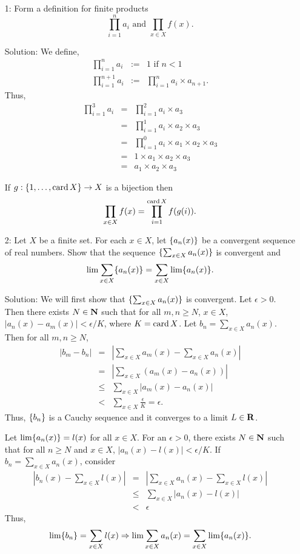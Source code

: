 \begin{enumerate}
\item[1:] Form a definition for finite products 
\[
\prod_{i=1}^n a_i \text{ and } \prod_{x \in X} f(x).
\]
\item[Solution:] We define,
\begin{eqnarray*}
\prod_{i=1}^na_i &:=& 1 \text{ if } n < 1 \\
\prod_{i=1}^{n+1}a_i &:=& \prod_{i=1}^n a_i \times a_{n+1}.
\end{eqnarray*}
Thus,
\begin{eqnarray*}
\prod_{i=1}^3a_i &=& \prod_{i=1}^2 a_i \times a_3 \\
 &=& \prod_{i=1}^1 a_i \times a_2 \times a_3 \\
 &=& \prod_{i=1}^0 a_i \times a_1 \times a_2 \times a_3 \\
 &=& 1 \times a_1 \times a_2 \times a_3 \\
 &=& a_1 \times a_2 \times a_3 
\end{eqnarray*}

If $g:\{1, \ldots, \operatorname{card} X\} \rightarrow X$ is a bijection then
\[
\prod_{x \in X} f(x) = \prod_{i=1}^{\operatorname{card} X} f(g(i)).
\]

\item[2:] Let $X$ be a finite set. For each $x \in X$, let $\{a_n(x)\}$
be a convergent sequence of real numbers. Show that the sequence 
$\{\sum_{x \in X} a_n(x)\}$ is convergent and
\[
\lim\sum_{x \in X}\{a_n(x)\} = \sum_{x \in X}\lim\{a_n(x)\}.
\]
\item[Solution:] We will first show that $\{\sum_{x \in X} a_n(x)\}$ is 
convergent. Let $\epsilon > 0$. Then there exists $N \in \mathbf{N}$ such that
for all $m, n \ge N$, $x \in X$, $|a_n(x) - a_m(x)| < \epsilon/K$, where
$K = \operatorname{card} X$. Let $b_n = \sum_{x \in X} a_n(x)$. Then for all $m, n \ge N$,
\begin{eqnarray*}
|b_m - b_n| 
 &=& \left|\sum_{x \in X} a_m(x) - \sum_{x \in X} a_n(x)\right| \\
 &=& \left|\sum_{x \in X} (a_m(x) - a_n(x))\right| \\
 &\le& \sum_{x \in X}|a_m(x) - a_n(x)| \\
 &<& \sum_{x \in X}\frac{\epsilon}{K} = \epsilon.
\end{eqnarray*}
Thus, $\{b_n\}$ is a Cauchy sequence and it converges to a limit $L \in 
\mathbf{R}$. 

Let $\lim\{a_n(x)\} = l(x)$ for all $x \in X$. For an $\epsilon > 0$,
there exists $N \in \mathbf{N}$ such that for all $n \ge N$ and $x \in X$,
$|a_n(x) - l(x)| < \epsilon/K$. If $b_n = \sum_{x \in X} a_n(x)$, consider
\begin{eqnarray*}
\left|b_n(x) - \sum_{x \in X}l(x)\right| 
 &=& \left|\sum_{x \in X}a_n(x) - \sum_{x \in X}l(x)\right| \\
 &\le& \sum_{x \in X} |a_n(x) - l(x)| \\
 &<& \epsilon
\end{eqnarray*}
Thus,
\[
\lim\{b_n\} = \sum_{x \in X} l(x) \Rightarrow
\lim\sum_{x \in X} a_n(x) = \sum_{x \in X}\lim\{a_n(x)\}.
\]


\end{enumerate}
